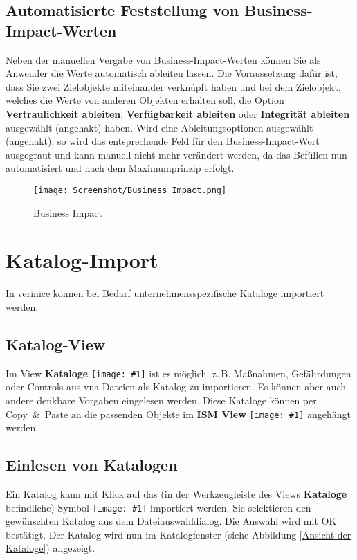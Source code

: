 \documentclass[a4paper,10pt]{book}
\newcommand{\icon}[1]{\texttt{[image: \#1]}}
\begin{document}
\subsection{Automatisierte Feststellung von Business-Impact-Werten} \label{Automatisierte Feststellung von Business-Impact-Werten}
Neben der manuellen Vergabe von Business-Impact-Werten können Sie als Anwender die Werte automatisch ableiten lassen.
Die Voraussetzung dafür ist, dass Sie zwei Zielobjekte miteinander verknüpft haben und bei dem Zielobjekt, welches die Werte von anderen
Objekten erhalten soll, die Option \textbf{Vertraulichkeit ableiten}, \textbf{Verfügbarkeit ableiten} oder \textbf{Integrität ableiten} ausgewählt (angehakt) haben.
Wird eine Ableitungsoptionen ausgewählt (angehakt), so wird das entsprechende Feld für den Business-Impact-Wert ausgegraut und kann manuell
nicht mehr verändert werden, da das Befüllen nun automatisiert und nach dem Maximumprinzip erfolgt.
\newline
\begin{figure}[htb!]
  \centering
  \texttt{[image: Screenshot/Business\_Impact.png]}
  \caption{\label{Business Impact} Business Impact}
\end{figure}
\newline

\section{Katalog-Import}
In verinice können bei Bedarf unternehmensspezifische Kataloge importiert werden.

\subsection{Katalog-View}
Im View \textbf{Kataloge} \icon{Icon/bp_catalog} ist es
möglich, z.\,B.  Maßnahmen, Gefährdungen oder Controls aus vna-Dateien als
Katalog zu importieren. Es können aber auch andere denkbare Vorgaben eingelesen
werden.  Diese Kataloge können per Copy~\&~Paste an die passenden Objekte im
\textbf{ISM View}
\icon{Icon/Informationssicherheitsmodell.png} angehängt
werden.

\subsection{Einlesen von Katalogen}\label{Einlesen von Katalogen}
Ein Katalog kann mit Klick auf das (in der Werkzeugleiste des Views
\textbf{Kataloge} befindliche) Symbol
\icon{Icon/Import.png} importiert werden. Sie
selektieren den gewünschten Katalog aus dem Dateiauswahldialog. Die Auswahl wird
mit OK bestätigt. Der Katalog wird nun im Katalogfenster (siehe Abbildung
\ref{Ansicht der Kataloge}) angezeigt.
\end{document}
